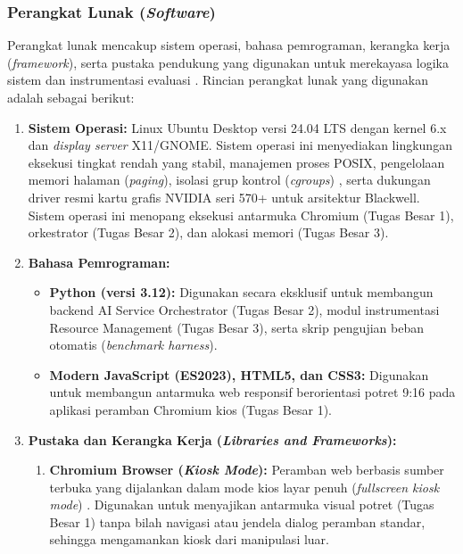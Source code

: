 \subsubsection{Perangkat Lunak (\textit{Software})}
\label{subsubsec:software}

Perangkat lunak mencakup sistem operasi, bahasa pemrograman, kerangka kerja (\textit{framework}), serta pustaka pendukung yang digunakan untuk merekayasa logika sistem dan instrumentasi evaluasi \cite{hossain2023role, velepucha2023survey}. Rincian perangkat lunak yang digunakan adalah sebagai berikut:

\begin{enumerate}[label=\alph*.]
    \item \textbf{Sistem Operasi:} Linux Ubuntu Desktop versi 24.04 LTS dengan kernel 6.x dan \textit{display server} X11/GNOME. Sistem operasi ini menyediakan lingkungan eksekusi tingkat rendah yang stabil, manajemen proses POSIX, pengelolaan memori halaman (\textit{paging}), isolasi grup kontrol (\textit{cgroups}) \cite{linux2026cgroup}, serta dukungan driver resmi kartu grafis NVIDIA seri 570+ untuk arsitektur Blackwell. Sistem operasi ini menopang eksekusi antarmuka Chromium (Tugas Besar 1), orkestrator (Tugas Besar 2), dan alokasi memori (Tugas Besar 3).

    \item \textbf{Bahasa Pemrograman:}
    \begin{itemize}
        \item \textbf{Python (versi 3.12):} Digunakan secara eksklusif untuk membangun backend AI Service Orchestrator (Tugas Besar 2), modul instrumentasi Resource Management (Tugas Besar 3), serta skrip pengujian beban otomatis (\textit{benchmark harness}).
        \item \textbf{Modern JavaScript (ES2023), HTML5, dan CSS3:} Digunakan untuk membangun antarmuka web responsif berorientasi potret 9:16 pada aplikasi peramban Chromium kios (Tugas Besar 1).
    \end{itemize}

    \item \textbf{Pustaka dan Kerangka Kerja (\textit{Libraries and Frameworks}):}
    \begin{enumerate}[label=\roman*.]
        \item \textbf{Chromium Browser (\textit{Kiosk Mode}):} Peramban web berbasis sumber terbuka yang dijalankan dalam mode kios layar penuh (\textit{fullscreen kiosk mode}) \cite{chromium2026kiosk}. Digunakan untuk menyajikan antarmuka visual potret (Tugas Besar 1) tanpa bilah navigasi atau jendela dialog peramban standar, sehingga mengamankan kiosk dari manipulasi luar.
        

\end{enumerate}
\end{enumerate}
